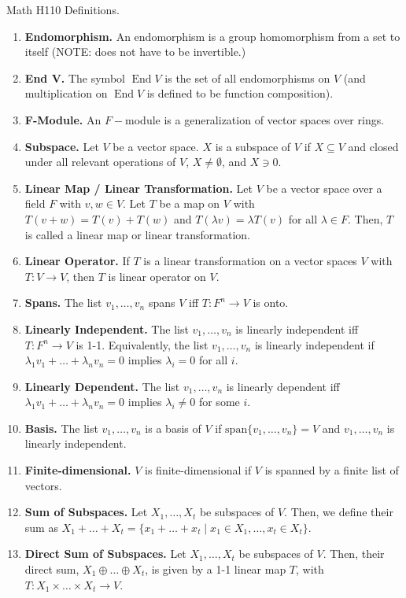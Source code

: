 \documentclass[12pt]{article}
\theoremstyle{definition}
\theoremstyle{named}
\DeclareMathOperator{\End}{End}
\begin{document}
\begin{center}
    Math H110 Definitions. 
\end{center}

\begin{enumerate}
    \item \textbf{Endomorphism. } An endomorphism is a group homomorphism from a set to itself (NOTE: does not have to be invertible.)
    \item \textbf{End V. } The symbol $\End V$ is the set of all endomorphisms on $V$ (and multiplication on $\End V$ is defined to be function composition). 
    \item \textbf{F-Module. } An $F-$module is a generalization of vector spaces over rings. 
    \item \textbf{Subspace. } Let $V$ be a vector space. $X$ is a subspace of $V$ if $X \subseteq V$ and closed under all relevant operations of $V$, $X \neq \emptyset$, and $X \ni 0$. 
    \item \textbf{Linear Map / Linear Transformation. } Let $V$ be a vector space over a field $F$ with $v,w \in V$. Let $T$ be a map on $V$ with $T(v+w) = T(v) + T(w)$ and $T(\lambda v) = \lambda T(v)$ for all $\lambda \in F$. Then, $T$ is called a linear map or linear transformation. 
    \item \textbf{Linear Operator. } If $T$ is a linear transformation on a vector spaces $V$ with $T: V \to V$, then $T$ is linear operator on $V$. 
    \item \textbf{Spans. } The list $v_1,\dots,v_n$ spans $V$ iff $T: F^n \to V$ is onto. 
    \item \textbf{Linearly Independent. } The list $v_1,\dots,v_n$ is linearly independent iff $T: F^n \to V$ is 1-1. Equivalently, the list $v_1,\dots,v_n$ is linearly independent if $\lambda_1v_1 + \dots + \lambda_nv_n = 0$ implies $\lambda_i=0$ for all $i$. 
    \item \textbf{Linearly Dependent. } The list $v_1,\dots,v_n$ is linearly dependent iff $\lambda_1v_1 + \dots + \lambda_nv_n = 0$ implies $\lambda_i \neq 0$ for some $i$. 
    \item \textbf{Basis. } The list $v_1,\dots,v_n$ is a basis of $V$ if $\textrm{span}\{v_1,\dots,v_n\} = V$ and $v_1,\dots,v_n$ is linearly independent. 
    \item \textbf{Finite-dimensional. } $V$ is finite-dimensional if $V$ is spanned by a finite list of vectors. 
    \item \textbf{Sum of Subspaces. } Let $X_1,\dots,X_t$ be subspaces of $V$. Then, we define their sum as $X_1 + \dots + X_t = \{x_1 + \dots + x_t \mid x_1 \in X_1, \dots, x_t \in X_t\}$. 
    \item \textbf{Direct Sum of Subspaces. } Let $X_1,\dots,X_t$ be subspaces of $V$. Then, their direct sum, $X_1 \oplus \dots \oplus X_t$, is given by a 1-1 linear map $T$, with $T: X_1\times \dots \times X_t \to V$. 
\end{enumerate}
\end{document}
